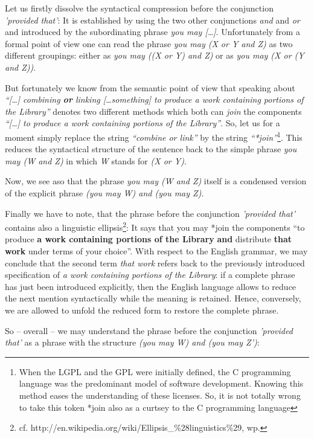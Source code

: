 Let us firstly dissolve the syntactical compression before the conjunction
\emph{'provided that'}: It is established by using the two other conjunctions
\emph{and} and \emph{or} and introduced by the subordinating phrase \emph{you
may [\ldots]}. Unfortunately from a formal point of view one can read the phrase
\emph{you may (X or Y and Z)} as two different groupings: either as \emph{you
may ((X or Y) and Z)} or as \emph{you may (X or (Y and Z))}.

But fortunately we know from the semantic point of view that speaking about
\emph{\enquote{[\ldots] combining \textbf{or} linking [\ldots something] to
produce a work containing portions of the Library}} denotes two different
methods which both can \emph{join} the components \emph{\enquote{[\ldots] to
produce a work containing portions of the Library}}. So, let us for a moment
simply replace the string \emph{\enquote{combine or link}} by the string
\emph{\enquote{*join}}\footnote{When the LGPL and the GPL were initially
defined, the C programming language was the predominant model of software
development. Knowing this method eases the understanding of these licenses. So,
it is not totally wrong to take this token *join also as a curtsey to the C
programming language}. This reduces the syntactical structure of the sentence
back to the simple phrase \emph{you may (W and Z)} in which \emph{W} stands for
\emph{(X or Y)}.

Now, we see aso that the phrase \emph{you may (W and Z)} itself is a
condensed version of the explicit phrase \emph{ (you may W) and (you may Z)}.

Finally we have to note, that the phrase before the conjunction \emph{'provided
that'} contains also a linguistic ellipsis\footnote{cf.
http://en.wikipedia.org/wiki/Ellipsis\_\%28linguistics\%29, wp.
}: It says that you may *join the components \enquote{to produce \textbf{a work
containing portions of the Library} \textbf{and} distribute \textbf{that work}
under terms of your choice}. With respect to the English grammar, we may
conclude that the second term \emph{that work} refers back to the previously
introduced specification of \emph{a work containing portions of the Library}: if
a complete phrase has just been introduced explicitly, then the English language
allows to reduce the next mention syntactically while the meaning is retained.
Hence, conversely, we are allowed to unfold the reduced form to restore the 
complete phrase.

So -- overall -- we may understand the phrase before the conjunction
\emph{'provided that'} as a phrase with the structure \emph{(you may W) and (you
may Z')}:

